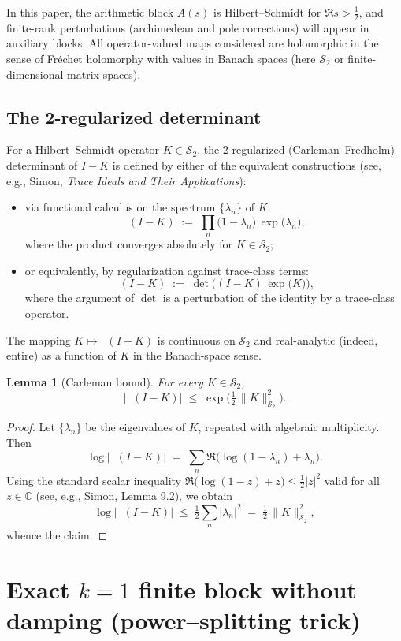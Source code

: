 \documentclass[11pt]{article}
\newtheorem{lemma}[theorem]{Lemma}
\theoremstyle{definition}
\theoremstyle{remark}
\newcommand{\C}{\mathbb{C}}
\newcommand{\HS}{\mathcal{S}_2}
\DeclareMathOperator{\dettwo}{det_2}
\begin{document}
In this paper, the arithmetic block \(A(s)\) is Hilbert--Schmidt for \(\Re s>\tfrac12\), and finite-rank perturbations (archimedean and pole corrections) will appear in auxiliary blocks. All operator-valued maps considered are holomorphic in the sense of Fr\'echet holomorphy with values in Banach spaces (here \(\HS\) or finite-dimensional matrix spaces).

\subsection{The 2-regularized determinant \(\dettwo\)}
For a Hilbert--Schmidt operator \(K\in\HS\), the 2-regularized (Carleman--Fredholm) determinant of \(I-K\) is defined by either of the equivalent constructions (see, e.g., Simon, \emph{Trace Ideals and Their Applications}):
\begin{itemize}
 \item via functional calculus on the spectrum \(\{\lambda_n\}\) of \(K\):
 \[
  \dettwo(I-K)\;:=\;\prod_{n}\big(1-\lambda_n\big)\,\exp\!\big(\lambda_n\big),
 \]
 where the product converges absolutely for \(K\in\HS\);
 \item or equivalently, by regularization against trace-class terms:
 \[
  \dettwo(I-K)\;:=\;\det\!\Big((I-K)\,\exp\big(K\big)\Big),
 \]
 where the argument of \(\det\) is a perturbation of the identity by a trace-class operator.
\end{itemize}
The mapping \(K\mapsto \dettwo(I-K)\) is continuous on \(\HS\) and real-analytic (indeed, entire) as a function of \(K\) in the Banach-space sense.

\begin{lemma}[Carleman bound]\label{lem:carleman}
For every \(K\in\HS\),
\[
 \big|\dettwo(I-K)\big|\;\le\; \exp\!\Big(\tfrac12\,\|K\|_{\HS}^2\Big).
\]
\end{lemma}
\begin{proof}
Let \(\{\lambda_n\}\) be the eigenvalues of \(K\), repeated with algebraic multiplicity. Then
\[
 \log\big|\dettwo(I-K)\big|\;=\; \sum_n \Re\Big(\log(1-\lambda_n)+\lambda_n\Big).
\]
Using the standard scalar inequality \(\Re\big(\log(1-z)+z\big)\le \tfrac12 |z|^2\) valid for all \(z\in\C\) (see, e.g., Simon, Lemma 9.2), we obtain
\[
 \log\big|\dettwo(I-K)\big|\;\le\; \tfrac12\sum_n |\lambda_n|^2\;=\;\tfrac12\,\|K\|_{\HS}^2,
\]
whence the claim.
\end{proof}

\section*{Exact $k=1$ finite block without damping (power--splitting trick)}
\end{document}
